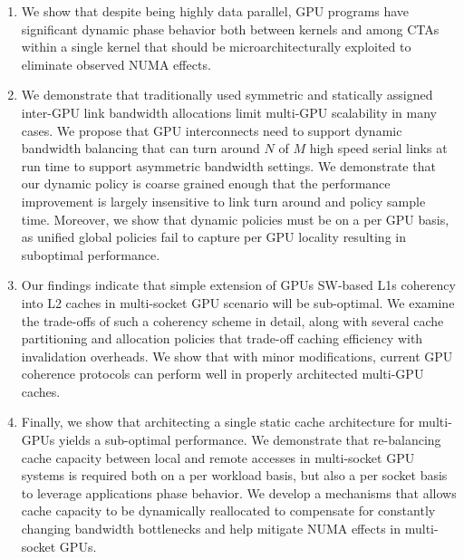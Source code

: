 \begin{enumerate} \item We show that despite being highly data parallel, GPU
programs have significant dynamic phase behavior both between kernels and among
CTAs within a single kernel that should be microarchitecturally exploited to
eliminate observed NUMA effects.

\item We demonstrate that traditionally used symmetric and statically assigned
inter-GPU link bandwidth allocations limit multi-GPU scalability in many cases.
We propose that GPU interconnects need to support dynamic bandwidth balancing
that can turn around $N$ of $M$ high speed serial links at run time to support
asymmetric bandwidth settings. We demonstrate that our dynamic policy is coarse
grained enough that the performance improvement is largely insensitive to link
turn around and policy sample time. Moreover, we show that dynamic policies
must be on a per GPU basis, as unified global policies fail to capture per GPU
locality resulting in suboptimal performance.

\item
Our findings indicate that simple extension of GPUs SW-based L1s coherency into
L2 caches in multi-socket GPU scenario will be sub-optimal.  
We examine the trade-offs of such a coherency scheme in detail, 
along with several cache partitioning and allocation policies that trade-off
caching efficiency with invalidation overheads. We show that with minor modifications, 
current GPU coherence protocols can perform well in properly architected multi-GPU caches.

\item Finally, we show that architecting a single static cache architecture for
multi-GPUs yields a sub-optimal performance. We demonstrate that re-balancing cache
capacity between local and remote accesses in multi-socket GPU systems is
required both on a per workload basis, but also a per socket basis to leverage
applications phase behavior. We develop a mechanisms that allows cache capacity
to be dynamically reallocated to compensate for constantly changing bandwidth
bottlenecks and help mitigate NUMA effects in multi-socket GPUs.






\end{enumerate}

